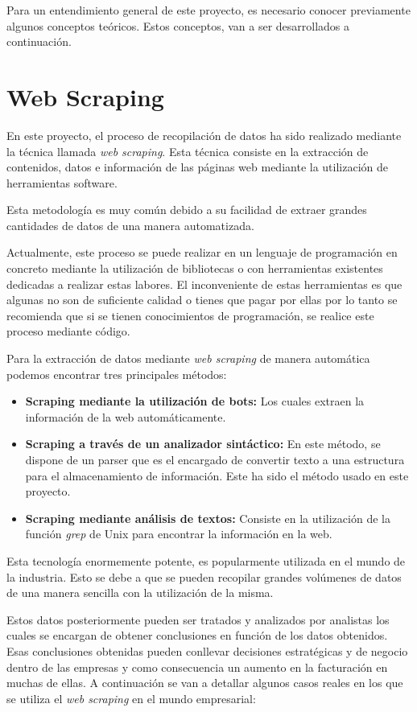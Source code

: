 Para un entendimiento general de este proyecto, es necesario conocer previamente algunos conceptos teóricos. Estos conceptos, van a ser desarrollados a continuación. 

\section{Web Scraping}
En este proyecto, el proceso de recopilación de datos ha sido realizado mediante la técnica llamada \textit{web scraping}. Esta técnica consiste en la extracción de contenidos, datos e información de las páginas web mediante la utilización de herramientas software.

Esta metodología es muy común debido a su facilidad de extraer grandes cantidades de datos de una manera automatizada.

Actualmente, este proceso se puede realizar en un lenguaje de programación en concreto mediante la utilización de bibliotecas o con herramientas existentes dedicadas a realizar estas labores. El inconveniente de estas herramientas es que algunas no son de suficiente calidad o tienes que pagar por ellas por lo tanto se recomienda que si se tienen conocimientos de programación, se realice este proceso mediante código. 

Para la extracción de datos mediante \textit{web scraping} de manera automática podemos encontrar tres principales métodos:
\begin{itemize}
    \item \textbf{Scraping mediante la utilización de bots:} Los cuales extraen la información de la web automáticamente.
    \item \textbf{Scraping a través de un analizador sintáctico:} En este método, se dispone de un parser que es el encargado de convertir texto a una estructura para el almacenamiento de información. Este ha sido el método usado en este proyecto.
    \item \textbf{Scraping mediante análisis de textos:} Consiste en la utilización de la función \textit{grep} de Unix para encontrar la información en la web.
\end{itemize}

Esta tecnología enormemente potente, es popularmente utilizada en el mundo de la industria. Esto se debe a que se pueden recopilar grandes volúmenes de datos de una manera sencilla con la utilización de la misma.
    
Estos datos posteriormente pueden ser tratados y analizados por analistas los cuales se encargan de obtener conclusiones en función de los datos obtenidos. Esas conclusiones obtenidas pueden conllevar decisiones estratégicas y de negocio dentro de las empresas y como consecuencia un aumento en la facturación en muchas de ellas. A continuación se van a detallar algunos casos reales en los que se utiliza el \textit{web scraping} en el mundo empresarial:

